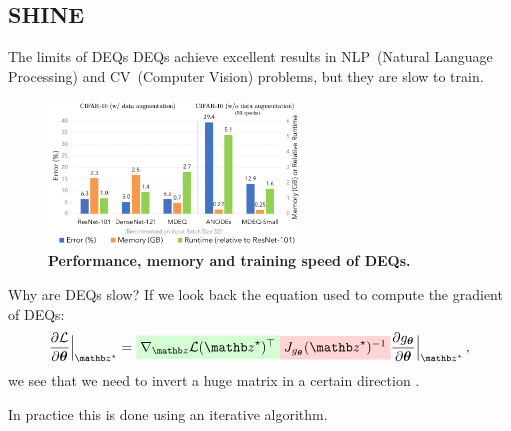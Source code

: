 \subsection{SHINE}
\begin{frame}{The limits of DEQs}
    DEQs achieve excellent results in NLP~(Natural Language Processing) and CV~(Computer Vision) problems, but they are slow to train.

    \begin{figure}
        \centering
        \includegraphics[width=0.6\textwidth]{Figures/shine_figures/deq_memory.png}
        \caption{\textbf{Performance, memory and training speed of DEQs.}~\citep{Bai2020MultiscaleModels}}
    \end{figure}
\end{frame}

\begin{frame}{Why are DEQs slow?}
    If we look back the equation used to compute the gradient of DEQs:
    \begin{equation*}
        \frac{\partial \mathcal{L}}{\partial \thetab}\Bigr|_{\zb^\star} = \highlight{green}{$\nabla_\zb \mathcal{L}(\zb^\star)^\top$} \highlight{red}{$J_{g_{\thetab}}(\zb^\star)^{-1}$} \frac{\partial g_{\thetab}}{\partial \thetab}\Bigr|_{\zb^\star} \, ,
    \end{equation*}
    we see that we need to invert a huge matrix  in a certain direction .
    \pause

    In practice this is done using an iterative algorithm.
\end{frame}


